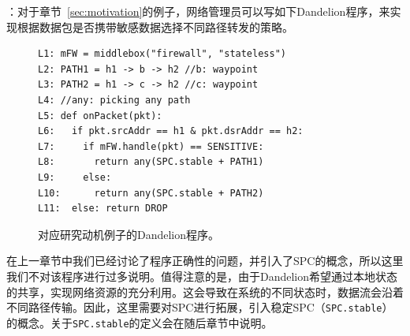\documentclass{ctexart}
\newcommand{\para}[1]{\noindent {\bf #1}}%
\newcommand{\codeword}[1]{\texttt{\small{#1}}}
\newcommand \bnfdef  {\mathrel{\color{blue}{::=}}}
\newcommand \bnfalt  {\mathrel{\color{blue}{|}}}
\newcommand \tx {\mathtt{x}}
\newcommand \ty {\mathtt{y}}
\begin{document}

\para{Dandelion程序示例}：对于章节~\ref{sec:motivation}的例子，网络管理员可以写如下Dandelion程序，来实现根据数据包是否携带敏感数据选择不同路径转发的策略。




\begin{figure}[h]
\begin{verbatim}
L1: mFW = middlebox("firewall", "stateless")
L2: PATH1 = h1 -> b -> h2 //b: waypoint
L3: PATH2 = h1 -> c -> h2 //c: waypoint
L4: //any: picking any path
L5: def onPacket(pkt):
L6:   if pkt.srcAddr == h1 & pkt.dsrAddr == h2:
L7:     if mFW.handle(pkt) == SENSITIVE:
L8:       return any(SPC.stable + PATH1)
L9:     else:
L10:      return any(SPC.stable + PATH2)
L11:  else: return DROP
\end{verbatim}
	\caption{对应研究动机例子的Dandelion程序。}
\label{fig:code}
\end{figure}

在上一章节中我们已经讨论了程序正确性的问题，并引入了SPC的概念，所以这里我们不对该程序进行过多说明。值得注意的是，由于Dandelion希望通过本地状态的共享，实现网络资源的充分利用。这会导致在系统的不同状态时，数据流会沿着不同路径传输。因此，这里需要对SPC进行拓展，引入稳定SPC（\codeword{SPC.stable}）的概念。关于\codeword{SPC.stable}的定义会在随后章节中说明。
\end{document}
